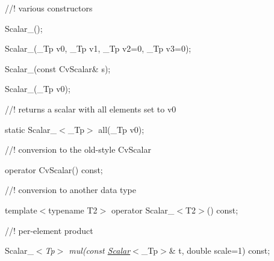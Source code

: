 {\ttfamily }

{\ttfamily }

{\ttfamily //! various constructors}

{\ttfamily }

{\ttfamily }

{\ttfamily Scalar\+\_\+();}

{\ttfamily }

{\ttfamily }

{\ttfamily Scalar\+\_\+(\+\_\+\+Tp v0, \+\_\+\+Tp v1, \+\_\+\+Tp v2=0, \+\_\+\+Tp v3=0);}

{\ttfamily }

{\ttfamily }

{\ttfamily Scalar\+\_\+(const Cv\+Scalar\& s);}

{\ttfamily }

{\ttfamily }

{\ttfamily Scalar\+\_\+(\+\_\+\+Tp v0);}

{\ttfamily }

{\ttfamily }

{\ttfamily //! returns a scalar with all elements set to v0}

{\ttfamily }

{\ttfamily }

{\ttfamily static Scalar\+\_\+$<$\+\_\+\+Tp$>$ all(\+\_\+\+Tp v0);}

{\ttfamily }

{\ttfamily }

{\ttfamily //! conversion to the old-\/style Cv\+Scalar}

{\ttfamily }

{\ttfamily }

{\ttfamily operator Cv\+Scalar() const;}

{\ttfamily }

{\ttfamily }

{\ttfamily //! conversion to another data type}

{\ttfamily }

{\ttfamily }

{\ttfamily template$<$typename T2$>$ operator Scalar\+\_\+$<$\+T2$>$() const;}

{\ttfamily }

{\ttfamily }

{\ttfamily //! per-\/element product}

{\ttfamily }

{\ttfamily }

{\ttfamily Scalar\+\_\+$<${\itshape Tp$>$ mul(const \mbox{\hyperlink{classorg_1_1opencv_1_1core_1_1_scalar}{Scalar}}}$<$\+\_\+\+Tp$>$\& t, double scale=1) const;}

